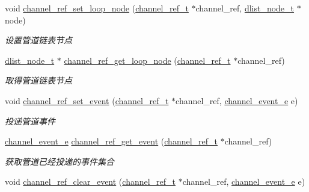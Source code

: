 \begin{DoxyCompactItemize}
void \hyperlink{a00047_a98676b725d853de8a576f97e1eeb9068_a98676b725d853de8a576f97e1eeb9068}{channel\+\_\+ref\+\_\+set\+\_\+loop\+\_\+node} (\hyperlink{a00050_a151271c9d188ef28d4d24bb81dcc1263_a151271c9d188ef28d4d24bb81dcc1263}{channel\+\_\+ref\+\_\+t} $\ast$channel\+\_\+ref, \hyperlink{a00050_a62053232bcf3566010ef98a7d77c3cc8_a62053232bcf3566010ef98a7d77c3cc8}{dlist\+\_\+node\+\_\+t} $\ast$node)
\begin{DoxyCompactList}\small\item\em 设置管道链表节点 \end{DoxyCompactList}\item 
\hyperlink{a00050_a62053232bcf3566010ef98a7d77c3cc8_a62053232bcf3566010ef98a7d77c3cc8}{dlist\+\_\+node\+\_\+t} $\ast$ \hyperlink{a00047_a814d6826477cb62c5e4d6826dfdc418e_a814d6826477cb62c5e4d6826dfdc418e}{channel\+\_\+ref\+\_\+get\+\_\+loop\+\_\+node} (\hyperlink{a00050_a151271c9d188ef28d4d24bb81dcc1263_a151271c9d188ef28d4d24bb81dcc1263}{channel\+\_\+ref\+\_\+t} $\ast$channel\+\_\+ref)
\begin{DoxyCompactList}\small\item\em 取得管道链表节点 \end{DoxyCompactList}\item 
void \hyperlink{a00047_aaa459c5e4bd63d343a31b5968a3ae5bd_aaa459c5e4bd63d343a31b5968a3ae5bd}{channel\+\_\+ref\+\_\+set\+\_\+event} (\hyperlink{a00050_a151271c9d188ef28d4d24bb81dcc1263_a151271c9d188ef28d4d24bb81dcc1263}{channel\+\_\+ref\+\_\+t} $\ast$channel\+\_\+ref, \hyperlink{a00050_a5ad43ab162fdf9ad53cde10ed3d87d99_a5ad43ab162fdf9ad53cde10ed3d87d99}{channel\+\_\+event\+\_\+e} e)
\begin{DoxyCompactList}\small\item\em 投递管道事件 \end{DoxyCompactList}\item 
\hyperlink{a00050_a5ad43ab162fdf9ad53cde10ed3d87d99_a5ad43ab162fdf9ad53cde10ed3d87d99}{channel\+\_\+event\+\_\+e} \hyperlink{a00047_ac24dbde77cfb71c60e1497dfe4cb49f3_ac24dbde77cfb71c60e1497dfe4cb49f3}{channel\+\_\+ref\+\_\+get\+\_\+event} (\hyperlink{a00050_a151271c9d188ef28d4d24bb81dcc1263_a151271c9d188ef28d4d24bb81dcc1263}{channel\+\_\+ref\+\_\+t} $\ast$channel\+\_\+ref)
\begin{DoxyCompactList}\small\item\em 获取管道已经投递的事件集合 \end{DoxyCompactList}\item 
void \hyperlink{a00047_a08e70ed62a98136a26d326e25d1dbeac_a08e70ed62a98136a26d326e25d1dbeac}{channel\+\_\+ref\+\_\+clear\+\_\+event} (\hyperlink{a00050_a151271c9d188ef28d4d24bb81dcc1263_a151271c9d188ef28d4d24bb81dcc1263}{channel\+\_\+ref\+\_\+t} $\ast$channel\+\_\+ref, \hyperlink{a00050_a5ad43ab162fdf9ad53cde10ed3d87d99_a5ad43ab162fdf9ad53cde10ed3d87d99}{channel\+\_\+event\+\_\+e} e)

\end{DoxyCompactItemize}
